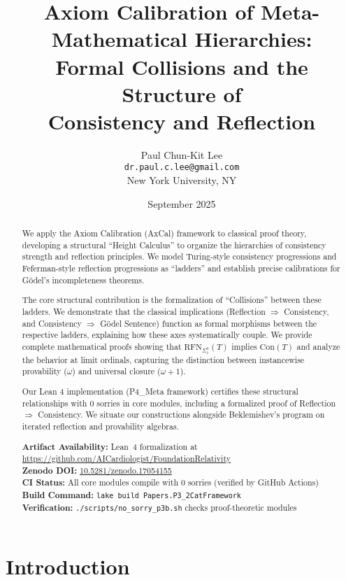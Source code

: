 \documentclass[11pt]{article}
\title{Axiom Calibration of Meta-Mathematical Hierarchies:\\
Formal Collisions and the Structure of\\
Consistency and Reflection}
\author{Paul Chun-Kit Lee\\
\texttt{dr.paul.c.lee@gmail.com}\\
New York University, NY}
\date{September 2025}
\newcommand{\Con}{\mathrm{Con}}
\newcommand{\RFNSigOne}{\mathrm{RFN}_{\Sigma^0_1}}
\begin{document}
\maketitle

\begin{abstract}
We apply the Axiom Calibration (AxCal) framework to classical proof theory, developing a structural ``Height Calculus'' to organize the hierarchies of consistency strength and reflection principles. We model Turing-style consistency progressions and Feferman-style reflection progressions as ``ladders'' and establish precise calibrations for Gödel's incompleteness theorems.

The core structural contribution is the formalization of ``Collisions'' between these ladders. We demonstrate that the classical implications (Reflection $\Rightarrow$ Consistency, and Consistency $\Rightarrow$ Gödel Sentence) function as formal morphisms between the respective ladders, explaining how these axes systematically couple. We provide complete mathematical proofs showing that $\RFNSigOne(T)$ implies $\Con(T)$ and analyze the behavior at limit ordinals, capturing the distinction between instancewise provability ($\omega$) and universal closure ($\omega+1$).

Our Lean 4 implementation (P4\_Meta framework) certifies these structural relationships with 0 sorries in core modules, including a formalized proof of Reflection $\Rightarrow$ Consistency. We situate our constructions alongside Beklemishev's program on iterated reflection and provability algebras.

\vspace{1em}
\noindent\textbf{Artifact Availability:} Lean~4 formalization at \url{https://github.com/AICardiologist/FoundationRelativity}\\
\textbf{Zenodo DOI:} \href{https://doi.org/10.5281/zenodo.17054155}{10.5281/zenodo.17054155}\\
\textbf{CI Status:} All core modules compile with 0 sorries (verified by GitHub Actions)\\
\textbf{Build Command:} \texttt{lake build Papers.P3\_2CatFramework}\\
\textbf{Verification:} \texttt{./scripts/no\_sorry\_p3b.sh} checks proof-theoretic modules
\end{abstract}

\tableofcontents

\section{Introduction}
\end{document}
